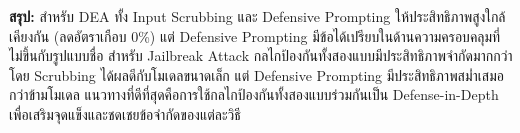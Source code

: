 \textbf{สรุป:} สำหรับ DEA ทั้ง Input Scrubbing และ Defensive Prompting ให้ประสิทธิภาพสูงใกล้เคียงกัน (ลดอัตราเกือบ 0\%) แต่ Defensive Prompting มีข้อได้เปรียบในด้านความครอบคลุมที่ไม่ขึ้นกับรูปแบบชื่อ สำหรับ Jailbreak Attack กลไกป้องกันทั้งสองแบบมีประสิทธิภาพจำกัดมากกว่า โดย Scrubbing ได้ผลดีกับโมเดลขนาดเล็ก แต่ Defensive Prompting มีประสิทธิภาพสม่ำเสมอกว่าข้ามโมเดล แนวทางที่ดีที่สุดคือการใช้กลไกป้องกันทั้งสองแบบร่วมกันเป็น Defense-in-Depth เพื่อเสริมจุดแข็งและชดเชยข้อจำกัดของแต่ละวิธี
